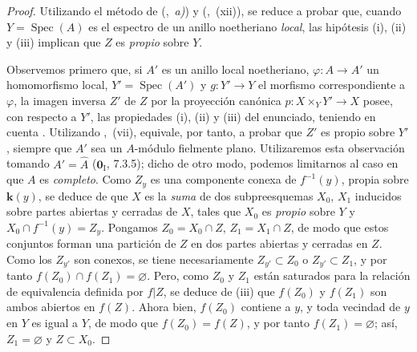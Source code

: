 \begin{proof}
Utilizando el método de (,~\emph{a)}) y (,~(xii)), se reduce a probar que, cuando $Y=\operatorname{Spec}(A)$ es el espectro de un anillo noetheriano \emph{local}, las hipótesis (i), (ii) y (iii) implican que $Z$ es \emph{propio} sobre $Y$.

Observemos primero que, si $A'$ es un anillo local noetheriano, $\varphi:A\to A'$ un homomorfismo local, $Y'=\operatorname{Spec}(A')$ y $g:Y'\to Y$ el morfismo correspondiente a $\varphi$, la imagen inversa $Z'$ de $Z$ por la proyección canónica $p:X\times_Y Y'\to X$ posee, con respecto a $Y'$, las propiedades (i), (ii) y (iii) del enunciado, teniendo en cuenta . Utilizando ,~(vii), equivale, por tanto, a probar que $Z'$ es propio sobre $Y'$, siempre que $A'$ sea un $A$-módulo fielmente plano.
Utilizaremos esta observación tomando $A'=\widehat A$ ($\mathbf{0}_{\mathrm{I}}$, 7.3.5); dicho de otro modo, podemos limitarnos al caso en que $A$ es \emph{completo}.
Como $Z_y$ es una componente conexa de $f^{-1}(y)$, propia sobre $\boldsymbol{k}(y)$, se deduce de  que $X$ es la \emph{suma} de dos subpreesquemas $X_0$, $X_1$ inducidos sobre partes abiertas y cerradas de $X$, tales que $X_0$ es \emph{propio} sobre $Y$ y $X_0\cap f^{-1}(y)=Z_y$.
Pongamos $Z_0=X_0\cap Z$, $Z_1=X_1\cap Z$, de modo que estos conjuntos forman una partición de $Z$ en dos partes abiertas y cerradas en $Z$.
Como los $Z_{y'}$ son conexos, se tiene necesariamente $Z_{y'}\subset Z_0$ o $Z_{y'}\subset Z_1$, y por tanto $f(Z_0)\cap f(Z_1)=\varnothing$.
Pero, como $Z_0$ y $Z_1$ están saturados para la relación de equivalencia definida por $f|Z$, se deduce de (iii) que $f(Z_0)$ y $f(Z_1)$ son ambos abiertos en $f(Z)$.
Ahora bien, $f(Z_0)$ contiene a $y$, y toda vecindad de $y$ en $Y$ es igual a $Y$, de modo que $f(Z_0)=f(Z)$, y por tanto $f(Z_1)=\varnothing$; así, $Z_1=\varnothing$ y $Z\subset X_0$.


\end{proof}
